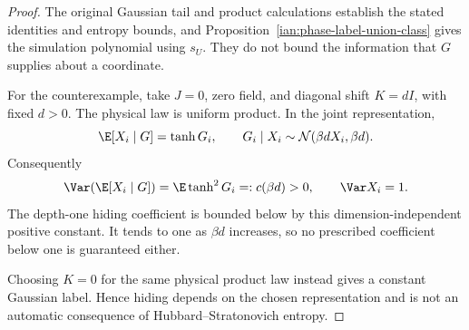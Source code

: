 \begin{proof}
The original Gaussian tail and product calculations establish the stated identities and entropy bounds, and Proposition~\ref{ian:phase-label-union-class} gives the simulation polynomial using \(s_U\). They do not bound the information that \(G\) supplies about a coordinate.

For the counterexample, take \(J=0\), zero field, and diagonal shift
\(K=dI\), with fixed \(d>0\). The physical law is uniform product. In the joint representation,
\[
 \E[X_i\mid G]=\tanh G_i,\qquad
 G_i\mid X_i\sim\mathcal N(\beta dX_i,\beta d).
\]
Consequently
\[
 \Var(\E[X_i\mid G])=\E\tanh^2G_i=:c(\beta d)>0,
 \qquad \Var X_i=1.
\]
The depth-one hiding coefficient is bounded below by this dimension-independent positive constant. It tends to one as \(\beta d\) increases, so no prescribed coefficient below one is guaranteed either.

Choosing \(K=0\) for the same physical product law instead gives a constant Gaussian label. Hence hiding depends on the chosen representation and is not an automatic consequence of Hubbard--Stratonovich entropy.
\end{proof}

